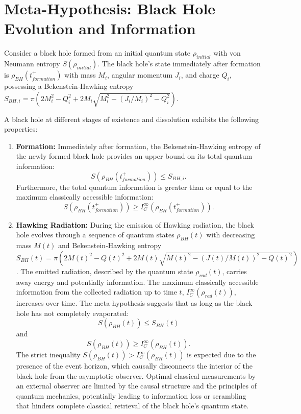 	\section{Meta-Hypothesis: Black Hole Evolution and Information}
	
	Consider a black hole formed from an initial quantum state $\rho_{initial}$ with von Neumann entropy $S(\rho_{initial})$. The black hole's state immediately after formation is $\rho_{BH}(t_{formation}^+)$ with mass $M_i$, angular momentum $J_i$, and charge $Q_i$, possessing a Bekenstein-Hawking entropy $S_{BH, i} = \pi \left( 2 M_i^2 - Q_i^2 + 2 M_i \sqrt{M_i^2 - (J_i/M_i)^2 - Q_i^2} \right)$.
	
	\begin{hypothesis}
		A black hole at different stages of existence and dissolution exhibits the following properties:
		\begin{enumerate}
			\item \textbf{Formation:} Immediately after formation, the Bekenstein-Hawking entropy of the newly formed black hole provides an upper bound on its total quantum information:
			$$S(\rho_{BH}(t_{formation}^+)) \le S_{BH, i}.$$
			Furthermore, the total quantum information is greater than or equal to the maximum classically accessible information:
			$$S(\rho_{BH}(t_{formation}^+)) \ge I_C^{\infty}(\rho_{BH}(t_{formation}^+)).$$
			
			\item \textbf{Hawking Radiation:} During the emission of Hawking radiation, the black hole evolves through a sequence of quantum states $\rho_{BH}(t)$ with decreasing mass $M(t)$ and Bekenstein-Hawking entropy $S_{BH}(t) = \pi \left( 2 M(t)^2 - Q(t)^2 + 2 M(t) \sqrt{M(t)^2 - (J(t)/M(t))^2 - Q(t)^2} \right)$. The emitted radiation, described by the quantum state $\rho_{rad}(t)$, carries away energy and potentially information. The maximum classically accessible information from the collected radiation up to time $t$, $I_C^{\infty}(\rho_{rad}(t))$, increases over time. The meta-hypothesis suggests that as long as the black hole has not completely evaporated:
			$$S(\rho_{BH}(t)) \le S_{BH}(t)$$
			and
			$$S(\rho_{BH}(t)) \ge I_C^{\infty}(\rho_{BH}(t)).$$
			The strict inequality $S(\rho_{BH}(t)) > I_C^{\infty}(\rho_{BH}(t))$ is expected due to the presence of the event horizon, which causally disconnects the interior of the black hole from the asymptotic observer. Optimal classical measurements by an external observer are limited by the causal structure and the principles of quantum mechanics, potentially leading to information loss or scrambling that hinders complete classical retrieval of the black hole's quantum state.
			

\end{enumerate}
\end{hypothesis}
